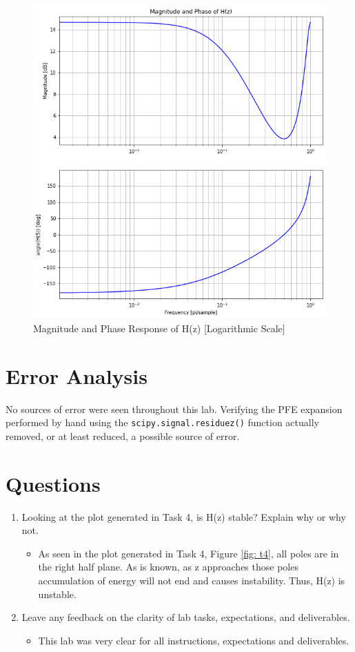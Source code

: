 \documentclass[12pt]{report}
\begin{document}
\begin{figure}[h!]
  \centering
  \includegraphics[width=\linewidth]{t5ls.png}
  \caption{Magnitude and Phase Response of H(z) [Logarithmic Scale]}
  \label{fig: t5ls}
\end{figure}


\section{Error Analysis}\label{section: ErAn}
No sources of error were seen throughout this lab. Verifying the PFE expansion performed by hand using the \texttt{scipy.signal.residuez()} function
actually removed, or at least reduced, a possible source of error.

\section{Questions}\label{section: Questions}
\begin{enumerate}
  \item Looking at the plot generated in Task 4, is H(z) stable? Explain why or why not.
  \begin{itemize}
    \item As seen in the plot generated in Task 4, Figure \ref{fig: t4}, all poles are in the right half plane. As is known, as z approaches those poles accumulation
    of energy will not end and causes instability. Thus, H(z) is unstable.
  \end{itemize}
  \item Leave any feedback on the clarity of lab tasks, expectations, and deliverables.
  \begin{itemize}
    \item This lab was very clear for all instructions, expectations and deliverables.
  \end{itemize}
\end{enumerate}
\end{document}

